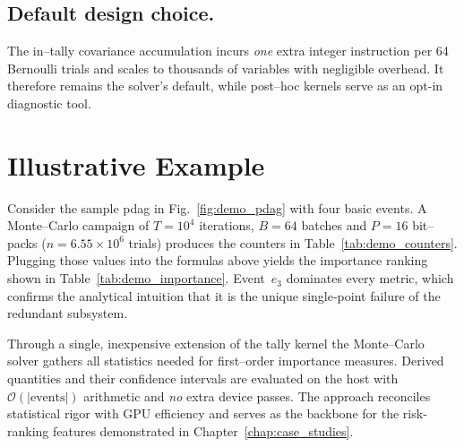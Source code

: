 \subsection{Default design choice.}  The in–tally covariance accumulation incurs
\emph{one} extra integer instruction per 64 Bernoulli trials and scales to
thousands of variables with negligible overhead.  It therefore remains the
solver’s default, while post–hoc kernels serve as an opt-in diagnostic tool.

\section{Illustrative Example}
Consider the sample \acrshort{pdag} in Fig.~\ref{fig:demo_pdag} with four basic
events.  A Monte–Carlo campaign of $T=10^4$ iterations, $B=64$ batches and
$P=16$ bit–packs ($n=6.55\times10^6$ trials) produces the counters in
Table~\ref{tab:demo_counters}.  Plugging those values into the formulas above
yields the importance ranking shown in
Table~\ref{tab:demo_importance}.  Event~$e_3$ dominates every metric, which
confirms the analytical intuition that it is the unique single‐point failure of
the redundant subsystem.

Through a single, inexpensive extension of the tally kernel the Monte–Carlo
solver gathers all statistics needed for first–order importance measures.
Derived quantities and their confidence intervals are evaluated on the host
with $\mathcal{O}(\lvert\text{events}\rvert)$ arithmetic and \emph{no} extra
device passes.  The approach reconciles statistical rigor with GPU efficiency
and serves as the backbone for the risk‐ranking features demonstrated in
Chapter~\ref{chap:case_studies}.

